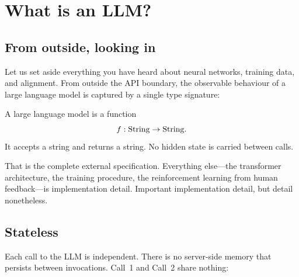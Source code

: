 
\section{What is an LLM?}\label{sec:what-is-llm}

\subsection{From outside, looking in}

Let us set aside everything you have heard about neural networks,
training data, and alignment.  From outside the API boundary, the
observable behaviour of a large language model is captured by a single
type signature:

\begin{definition}\label{def:llm-function}
  A large language model is a function
  \[
    f : \mathrm{String} \to \mathrm{String}.
  \]
  It accepts a string and returns a string.  No hidden state is carried
  between calls.
\end{definition}

That is the complete external specification.  Everything else---the
transformer architecture, the training procedure, the reinforcement
learning from human feedback---is implementation detail.  Important
implementation detail, but detail nonetheless.

\subsection{Stateless}

Each call to the LLM is independent.  There is no server-side memory
that persists between invocations.  Call~1 and Call~2 share nothing:

\begin{center}
\end{center}

